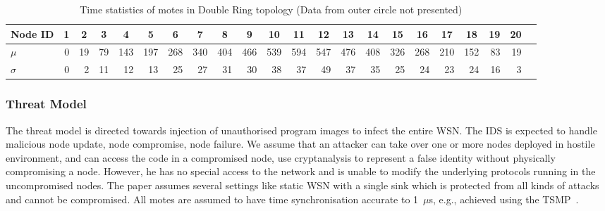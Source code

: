 \documentclass[conference]{IEEEtran}
\newcommand*{\bd}[1]{\multicolumn{1}{|c|}{\bfseries #1}}
\begin{document}
\begin{table}[t!]
\centering
\begin{tabular}{|l|*{20}{r|}r|}
\hline
\bd{Node ID}           & \bd{1} & \bd{2} & \bd{3} & \bd{4} & \bd{5} & \bd{6} & \bd{7} & \bd{8} & \bd{9} & \bd{10} & \bd{11} & \bd{12} & \bd{13} & \bd{14} & \bd{15} & \bd{16} & \bd{17} & \bd{18} & \bd{19} & \bd{20} \\
\hline
$\mu$            & 0 &19 & 79& 143&197 &268&340&404&466&539 &594 &547 &476 &408 &326 & 268&210 & 152 & 83 & 19 \\
$\sigma$		 & 0 & 2 & 11 & 12 & 13 & 25& 27&31 &30 & 38 & 37 & 49 & 37 & 35 & 25  & 24 & 23 & 24 & 16 & 3 \\
\hline
\end{tabular}
\caption{Time statistics of motes in Double Ring topology (Data from outer circle not presented)}
\label{tab:stat_ellip}
\end{table}

\subsubsection*{Threat Model}
The threat model is directed towards injection of unauthorised program images to infect the entire WSN.
The IDS is expected to handle malicious node update, node compromise, node failure.
We assume that an  attacker  can take over one or more nodes deployed in hostile environment, and can access the code in a compromised node, use cryptanalysis to represent a false identity without physically compromising a node.
However, he has  no special  access to  the  network and is unable to modify the underlying protocols running in the uncompromised nodes.
The paper assumes several settings like static WSN with a single  sink which is  protected from all kinds of attacks and cannot be compromised. All motes are assumed to have time synchronisation accurate to 1~$\mu$s, e.g., achieved using the TSMP~\cite{Pister08tsmp:time}.
\end{document}
